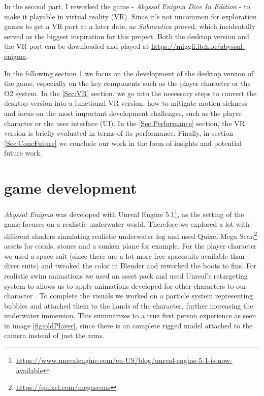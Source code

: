 \documentclass[letterpaper, 10 pt, conference]{ieeeconf}  %
\begin{document}
In the second part, I  reworked the game - \textit{Abyssal Enigma Dive In Edition} - to make it playable in virtual reality (VR).
Since it's not uncommon for exploration games to get a VR port at a later date, as \textit{Subnautica} \cite{Subnautica} proved, 
which incidentally served as the biggest inspiration for this project.
Both the desktop version and the VR port can be downloaded and played at
\url{https://miggli.itch.io/abyssal-enigma}.

In the following section \ref{Sec:Game} we focus on the development of the desktop version of the game, 
especially on the key components such as the player character or the O2 system.
In the \ref{Sec:VR} section, we go into the necessary steps to convert the desktop version into a functional VR version,
how to mitigate motion sickness 
and focus on the most important development challenges, such as the player character or the user interface (UI).
In the \ref{Sec:Performance} section, the VR version is briefly evaluated in terms of its performance.
Finally, in section \ref{Sec:ConcFuture} we conclude our work in the form of insights and potential future work.

\section{game development}
\label{Sec:Game}
\textit{Abyssal Enigma} was developed with Unreal Engine 5.1\footnote{\url{https://www.unrealengine.com/en-US/blog/unreal-engine-5-1-is-now-available}},
as the setting of the game focuses on a realistic underwater world.
Therefore we explored a lot with different shaders simulating realistic underwater fog 
and used Quixel Mega Scan\footnote{\url{https://quixel.com/megascans}} assets for corals, stones and a sunken plane for example. 
For the player character we used a space suit (since there are a lot more free spacesuits available than diver suits) 
and tweaked the color in Blender and reworked the boots to fins.
For realistic swim animations we used an asset pack and used Unreal's retargeting system to allows us to apply animations developed for
other characters to our character \cite{retarget}.
To complete the visuals we worked on a particle system representing bubbles and attached them to the hands of the character, further increasing the underwater immersion.
This summarizes to a true first person experience as seen in image \ref{fig:oldPlayer}, since there is an complete rigged model attached to the camera instead of just the arms.
\end{document}
